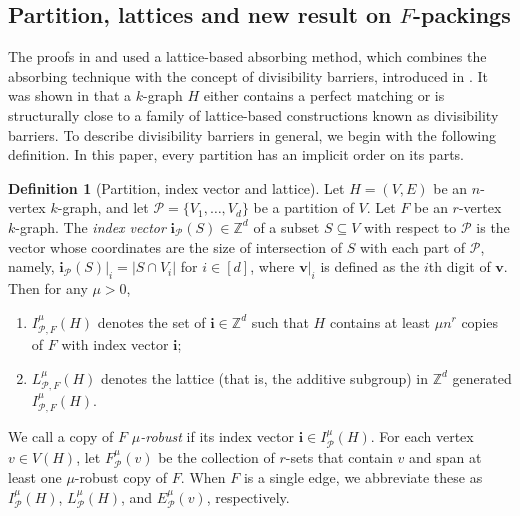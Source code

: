 \documentclass[11pt, letterpaper]{amsart}
\theoremstyle{plain}
\numberwithin{equation}{section}
\theoremstyle{definition}
\newtheorem{definition}[thm]{Definition}
\newcommand\card[1]{\left| #1 \right|}
\renewcommand{\vec}[1]{{\mathbf #1}}
\begin{document}
\subsection{\texorpdfstring{Partition, lattices and new result on $F$-packings}{Partition, lattices and new result on F-packings}}

The proofs in \cite{han2017decision} and \cite{han2020complexity} used a lattice-based absorbing method, which combines the absorbing technique with the concept of divisibility barriers, introduced in \cite{keevash2015geometric}. 
    It was shown in \cite{keevash2015geometric} that a $k$-graph $H$ either contains a perfect matching or is structurally close to a family of lattice-based constructions known as divisibility barriers. 
    To describe divisibility barriers in general, we begin with the following definition. 
    In this paper, every partition has an implicit order on its parts. 

    \begin{definition}
    [Partition, index vector and lattice]
        Let \(H=\left(V,E\right)\) be an \(n\)-vertex \(k\)-graph, and let \(\mathcal{P}=\{V_1,\dots,V_d\}\) be a partition of \(V\). 
        Let \(F\) be an \(r\)-vertex \(k\)-graph. The \emph{index vector} \(\vec{i}_{\mathcal{P}}(S)\in \mathbb{Z}^d \) of a subset \(S\subseteq V\) with respect to \(\mathcal{P}\) is the vector whose coordinates are the size of intersection of \(S\) with each part of \(\mathcal{P}\), namely, \(\vec{i}_{\mathcal{P}}(S)|_i=\card{S\cap V_i}\) for \(i\in [d]\), where \(\vec{v}|_i\) is defined as the \(i\)th digit of \(\vec{v}\). 
        Then for any \(\mu >0\), 
        \begin{enumerate}[label=(L\arabic*)]
            \item \(I_{\mathcal{P},F}^{\mu}(H)\) denotes the set of \(\vec{i}\in \mathbb{Z}^d\) such that \(H\) contains at least \(\mu n^r\) copies of \(F\) with index vector \(\vec{i}\);
            \item \(L_{\mathcal{P},F}^{\mu}(H)\) denotes the lattice (that is, the additive subgroup) in \(\mathbb{Z}^d\) generated \(I_{\mathcal{P},F}^{\mu}(H)\).
        \end{enumerate}
    \end{definition}
    
    We call a copy of \(F\) \emph{\(\mu\)-robust} if its index vector $\vec{i}\in I_{\mathcal{P}}^{\mu}(H)$.
    For each vertex $ v\in V(H) $, let $ F^{\mu}_{\mathcal{P}}(v) $ be the collection of \(r\)-sets that contain $v$ and span at least one \(\mu\)-robust copy of \(F\). 
    When \(F\) is a single edge, we abbreviate these as \(I_{\mathcal{P}}^{\mu}(H)\), \(L_{\mathcal{P}}^{\mu}(H)\), and \( E^{\mu}_{\mathcal{P}}(v) \), respectively. 
    
\end{document}
